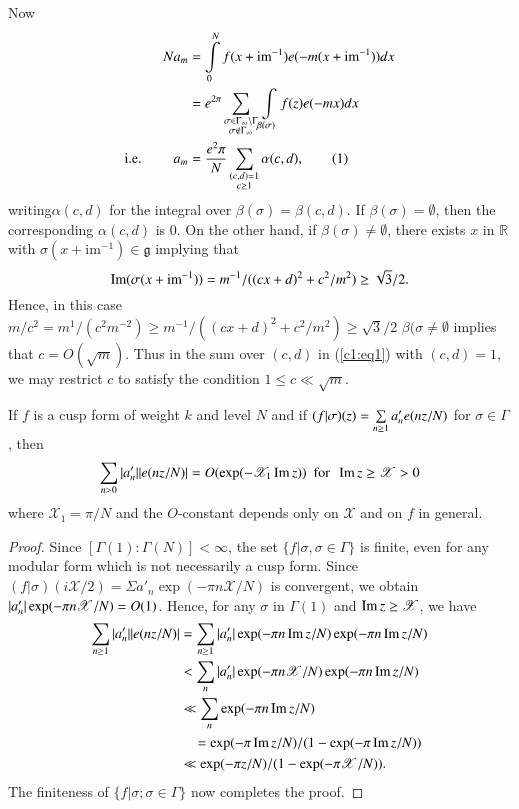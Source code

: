 Now 
\begin{align*}
Na_{m}
&=\int\limits^{N}_{0}f(x+\text{im}^{-1})e(-m(x+\text{im}^{-1}))dx\\
&= e^{2\pi}\sum\limits_{\substack{\sigma\in
    \Gamma_{\infty}\backslash\Gamma\\ \sigma\not\in\Gamma_{\infty}}}\int\limits_{\beta(\sigma)}f(z)e(-mx)dx\\
\text{{i.e.}\kern.3em}\qquad a_{m} &=
\frac{e^{2}\pi}{N}\sum_{\substack{(c,d)=1\\ c\geq 1}}
\alpha(c,d),\tag{1}\label{c1:eq1} 
\end{align*}
writing\pageoriginale $\alpha(c,d)$ for the integral over
$\beta(\sigma)=\beta(c,d)$. If $\beta(\sigma)=\emptyset$, then the
corresponding $\alpha(c,d)$ is $0$. On the other hand, if
$\beta(\sigma)\neq \emptyset$, there exists $x$ in $\mathbb{R}$ with
$\sigma(x+\text{im}^{-1})\in\mathfrak{g}$ implying that 
$$
\operatorname{Im} (\sigma(x+\text{im}^{-1}))=m^{-1}/((cx+d)^{2}+c^{2}/m^{2})\geq
\sqrt{3}/2.
$$
Hence, in this case $m/c^{2}=m^{1}/(c^{2}m^{-2})\geq
m^{-1}/((cx+d)^{2}+c^{2}/m^{2})\geq \sqrt{3}/2$ \ie $\beta(\sigma\neq
\emptyset$ implies that $c=O(\sqrt{m})$. Thus in the sum over $(c,d)$ in
(\ref{c1:eq1}) with $(c,d)=1$, we may restrict $c$ to satisfy the condition
$1\leq c\ll \sqrt{m}$.

\setcounter{sublemma}{2}
\begin{sublemma}\label{c1:lem-1.1.3}
If $f$ is a cusp form of weight $k$ and level $N$ and if
$(f|\sigma)\break (z)=\sum\limits_{n\geq 1}a'_{n}e(nz/N)$ for
$\sigma\in\Gamma$, then
$$
\sum_{n>0}|a'_{n}||e(nz/N)|= O(\exp(-\mathscr{X}_{1}\operatorname{Im} z))\text{
  \ for \ } \operatorname{Im} z\geq \mathscr{X}>0
$$
where $\mathscr{X}_{1}=\pi/N$ and the $O$-constant depends only on
$\mathscr{X}$ and on $f$ in general.
\end{sublemma}

\begin{proof}
Since $[\Gamma(1):\Gamma(N)]<\infty$, the set
$\{f|\sigma,\sigma\in\Gamma\}$ is finite, even for any modular form
which is not necessarily a cusp form. Since
$(f|\sigma)(i\mathscr{X}/2)=\Sigma a'_{n}\exp(-\pi n\mathscr{X}/N)$ is
convergent, we obtain $|a'_{n}|\break\exp(-\pi n\mathscr{X}/N)=O(1)$. Hence,
for any $\sigma$ in $\Gamma(1)$ and $\operatorname{Im} z\geq \mathscr{X}$, we have
\begin{align*}
\sum_{n\geq 1}|a'_{n}||e(nz/N)| &= \sum_{n\geq 1}|a'_{n}|\exp(-\pi
n\operatorname{Im} z/N)\exp(-\pi n\operatorname{Im} z/N)\\
&< \sum_{n}|a'_{n}|\exp(-\pi n\mathscr{X}/N)\exp(-\pi n\operatorname{Im} z/N)\\
&\ll \sum_{n}\exp(-\pi n\operatorname{Im} z/N)\\
&\quad=\exp(-\pi \operatorname{Im} z/N)/(1-\exp(-\pi
\operatorname{Im} z/N))\\
&\ll \exp(-\pi z/N)/(1-\exp(-\pi\mathscr{X}/N)). 
\end{align*}
The finiteness of $\{f|\sigma;\sigma\in\Gamma\}$ now completes the proof.
\end{proof}

